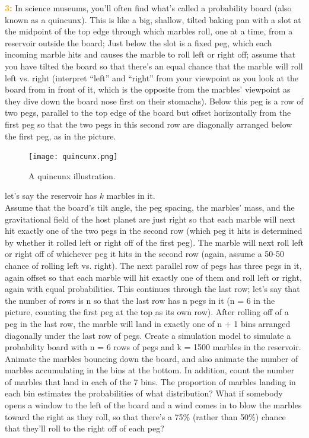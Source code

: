 \documentclass{article}
\begin{document}
\textcolor{orange}{\bf 3:}  In science museums, you'll often find what's called a probability board (also known as a quincunx). This is like a big, shallow, tilted baking pan with a slot at the midpoint of the top edge through which marbles roll, one at a time, from a reservoir outside the board; Just below the slot is a fixed peg, which each incoming marble hits and causes the marble to roll left or right off; assume that you have tilted the board so that there's an equal chance that the marble will roll left vs. right (interpret ``left'' and ``right'' from your viewpoint as you look at the board from in front of it, which is the opposite from the marbles' viewpoint as they dive down the board nose first on their stomachs). Below this peg is a row of two pegs, parallel to the top edge of the board but offset horizontally from the first peg so that the two pegs in this second row are diagonally arranged below the first peg, as in the picture.
\begin{figure}
\centering
\texttt{[image: quincunx.png]}
\caption{\label{fig:quincunx}A quincunx illustration.}
\end{figure}
let's say the reservoir has $k$ marbles in it. \\

 Assume that the board's tilt angle, the peg spacing, the marbles' mass, and the gravitational field of the host planet are just right so that each marble will next hit exactly one of the two pegs in the second row (which peg it hits is determined by whether it rolled left or right off of the first peg). The marble will next roll left or right off of whichever peg it hits in the second row (again, assume a 50-50 chance of rolling left vs. right). The next parallel row of pegs has three pegs in it, again offset so that each marble will hit exactly one of them and roll left or right, again with equal probabilities. This continues through the last row; let's say that the number of rows is n so that the last row has n pegs in it (n =  6 in the picture, counting the first peg at the top as its own row). After rolling off of a peg in the last row, the marble will land in exactly one of n + 1 bins arranged diagonally under the last row of pegs. Create a simulation model to simulate a probability board with n = 6 rows of pegs and k = 1500 marbles in the reservoir. Animate the marbles bouncing down the board, and also animate the number of marbles accumulating in the bins at the bottom. In addition, count the number of marbles that land in each of the 7 bins. The proportion of marbles landing in each bin estimates the probabilities of what distribution? What if somebody opens a window to the left of the board and a wind comes in to blow the marbles toward the right as they roll, so that there's a 75\% (rather than 50\%) chance that they'll roll to the right off of each peg?   \\
\end{document}
